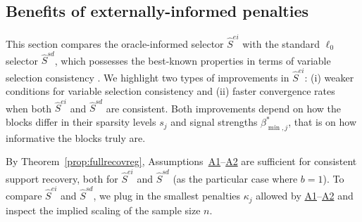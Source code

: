\documentclass[
  12pt]{article}
\newcommand{\bX}{\mathbf{X}}
\begin{document}
\subsection{Benefits of externally-informed penalties}\label{ssec:regression_gains}

This section compares the oracle-informed selector $\hat S^{ei}$ with the standard $\ell_0$ selector $\hat S^{sd}$, which possesses the best-known properties %
in terms of variable selection consistency \citep{gao2025optimalityl0}.
We highlight two types of improvements in $\hat S^{ei}$: %
(i) weaker conditions for variable selection consistency and (ii) faster convergence rates when both $\hat S^{ei}$ and $\hat S^{sd}$ are consistent.
Both improvements depend on how the blocks differ in their sparsity levels $s_j$ and signal strengths $\beta_{\min,j}^*$, that is on how informative the blocks truly are.

By Theorem~\ref{prop:fullrecovreg}, Assumptions~\hyperlink{lab:A1}{A1}–\hyperlink{lab:A2}{A2} are sufficient for consistent support recovery, both for $\hat S^{ei}$ and $\hat S^{sd}$ (as the particular case where $b=1$).
To compare $\hat S^{ei}$ and $\hat S^{sd}$, we plug in the smallest penalties $\kappa_j$  allowed by \hyperlink{lab:A1}{A1}–\hyperlink{lab:A2}{A2} and inspect the implied scaling of the sample size $n$.


\end{document}
